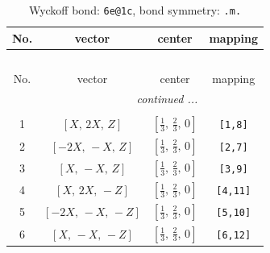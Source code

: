 \documentclass[fleqn,8pt]{jsarticle}
\begin{document}
\renewcommand{\arraystretch}{1.2}
\begin{longtable}{cccc}
\caption{Wyckoff bond: {\tt 6e@1c}, bond symmetry: {\tt .m.}}
 \\
 \hline \hline
No. & vector & center & mapping \\ \hline \endfirsthead

\multicolumn{3}{l}{\tablename\ \thetable{}} \\
 \hline \hline
No. & vector & center & mapping \\ \hline \endhead

 \hline \hline
\multicolumn{3}{r}{\footnotesize\it continued ...} \\ \endfoot

 \hline \hline
\multicolumn{3}{r}{} \\ \endlastfoot

1 & $\left[ X,\, 2 X,\, Z \right]$ & $\left[ \frac{1}{3},\, \frac{2}{3},\, 0 \right]$ & {\tt [1,8]} \\ \hline
2 & $\left[ - 2 X,\, - X,\, Z \right]$ & $\left[ \frac{1}{3},\, \frac{2}{3},\, 0 \right]$ & {\tt [2,7]} \\ \hline
3 & $\left[ X,\, - X,\, Z \right]$ & $\left[ \frac{1}{3},\, \frac{2}{3},\, 0 \right]$ & {\tt [3,9]} \\ \hline
4 & $\left[ X,\, 2 X,\, - Z \right]$ & $\left[ \frac{1}{3},\, \frac{2}{3},\, 0 \right]$ & {\tt [4,11]} \\ \hline
5 & $\left[ - 2 X,\, - X,\, - Z \right]$ & $\left[ \frac{1}{3},\, \frac{2}{3},\, 0 \right]$ & {\tt [5,10]} \\ \hline
6 & $\left[ X,\, - X,\, - Z \right]$ & $\left[ \frac{1}{3},\, \frac{2}{3},\, 0 \right]$ & {\tt [6,12]} \\
\end{longtable}
\renewcommand{\arraystretch}{1.2}
\end{document}
